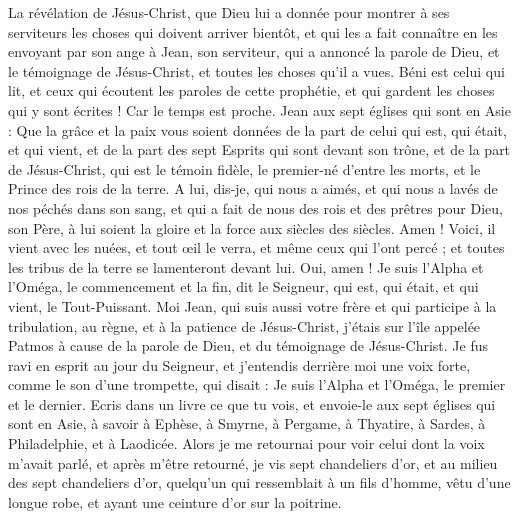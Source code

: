 \begin{multicols}{2}
\VerseOne{}La révélation de Jésus-Christ, que Dieu lui a donnée pour montrer à ses serviteurs les choses qui doivent arriver bientôt, et qui les a fait connaître en les envoyant par son ange à Jean, son serviteur,
qui a annoncé la parole de Dieu, et le témoignage de Jésus-Christ, et toutes les choses qu'il a vues.
Béni est celui qui lit, et ceux qui écoutent les paroles de cette prophétie, et qui gardent les choses qui y sont écrites ! Car le temps est proche.
Jean aux sept églises qui sont en Asie : Que la grâce et la paix vous soient données de la part de celui qui est, qui était, et qui vient, et de la part des sept Esprits qui sont devant son trône,
et de la part de Jésus-Christ, qui est le témoin fidèle, le premier-né d'entre les morts, et le Prince des rois de la terre.
A lui, dis-je, qui nous a aimés, et qui nous a lavés de nos péchés dans son sang, et qui a fait de nous des rois et des prêtres pour Dieu, son Père, à lui soient la gloire et la force aux siècles des siècles. Amen !
Voici, il vient avec les nuées, et tout œil le verra, et même ceux qui l'ont percé ; et toutes les tribus de la terre se lamenteront devant lui. Oui, amen !
Je suis l'Alpha et l'Oméga, le commencement et la fin, dit le Seigneur, qui est, qui était, et qui vient, le Tout-Puissant.
Moi Jean, qui suis aussi votre frère et qui participe à la tribulation, au règne, et à la patience de Jésus-Christ, j'étais sur l'île appelée Patmos à cause de la parole de Dieu, et du témoignage de Jésus-Christ.
Je fus ravi en esprit au jour du Seigneur, et j'entendis derrière moi une voix forte, comme le son d'une trompette,
qui disait : Je suis l'Alpha et l'Oméga, le premier et le dernier. Ecris dans un livre ce que tu vois, et envoie-le aux sept églises qui sont en Asie, à savoir à Ephèse, à Smyrne, à Pergame, à Thyatire, à Sardes, à Philadelphie, et à Laodicée.
Alors je me retournai pour voir celui dont la voix m'avait parlé, et après m'être retourné, je vis sept chandeliers d'or,
et au milieu des sept chandeliers d'or, quelqu'un qui ressemblait à un fils d'homme, vêtu d'une longue robe, et ayant une ceinture d'or sur la poitrine.

\end{multicols}
